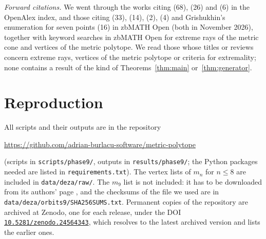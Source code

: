 \documentclass[11pt,a4paper]{article}
\theoremstyle{definition}
\theoremstyle{remark}
\newcommand{\file}[1]{\texttt{#1}}
\begin{document}
\emph{Forward citations.} We went through the works citing \cite{A80} (68), \cite{L96} (26) and \cite{DI07} (6) in
the OpenAlex index, and those citing \cite{A80} (33), \cite{L96} (14), \cite{DI07} (2), \cite{LP92} (4) and
Grishukhin's enumeration for seven points (16) in zbMATH Open (both in November 2026), together with keyword
searches in zbMATH Open for extreme rays of the metric cone and vertices of the metric polytope. We read those whose
titles or reviews concern extreme rays, vertices of the metric polytope or criteria for extremality; none contains
a result of the kind of Theorems~\ref{thm:main} or~\ref{thm:generator}.

\section{Reproduction}

All scripts and their outputs are in the repository
\begin{center}
\url{https://github.com/adrian-burlacu-software/metric-polytope}
\end{center}
(scripts in \file{scripts/phase9/}, outputs in \file{results/phase9/}; the Python packages needed are listed in
\file{requirements.txt}). The vertex lists of $m_n$ for $n \le 8$ are included in \file{data/deza/raw/}. The $m_9$
list is not included: it has to be downloaded from its authors' page \cite{DDweb}, and the checksums of the file we
used are in \file{data/deza/orbits9/SHA256SUMS.txt}. Permanent copies of the repository are archived at Zenodo, one for each release, under the DOI
\href{https://doi.org/10.5281/zenodo.24564343}{\nolinkurl{10.5281/zenodo.24564343}}, which resolves to the latest archived version and
lists the earlier ones.
\end{document}
